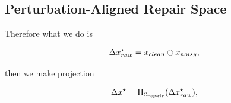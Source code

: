 \documentclass{article}
\begin{document}


\subsection{Perturbation-Aligned Repair Space}





	Therefore what we do is

	\begin{equation}
	\label{avg_precision}
	\centering
	\begin{split}
	\Delta x_{raw}^{\star} = x_{clean}\ominus x_{noisy},
	\end{split}
	\end{equation}

	then we make projection

	\begin{equation}
	\label{avg_precision}
	\centering
	\begin{split}
	\Delta x^{\star} = \Pi_{\mathcal{C}_{repair}}(\Delta x_{raw}^{\star}),
	\end{split}
	\end{equation}
\end{document}
